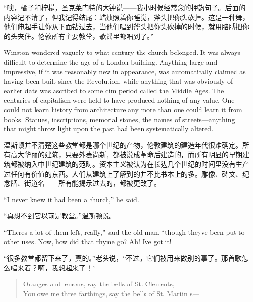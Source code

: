 \begin{paracol}{2}
\switchcolumn

``噢，橘子和柠檬，圣克莱门特的大钟说——我小时候经常念的押韵句子。后面的内容记不清了，但我记得结尾：蜡烛照着你睡觉，斧头把你头砍掉。这是一种舞，他们伸起手让你从下面钻过去，当他们唱到斧头把你头砍掉的时候，就用胳膊把你的头夹住。伦敦所有主要教堂，歌谣里都唱到了。''

\switchcolumn*

Winston wondered vaguely to what century the church belonged. It was
always difficult to determine the age of a London building. Anything
large and impressive, if it was reasonably new in appearance, was
automatically claimed as having been built since the Revolution, while
anything that was obviously of earlier date was ascribed to some dim
period called the Middle Ages. The centuries of capitalism were held to
have produced nothing of any value. One could not learn history from
architecture any more than one could learn it from books. Statues,
inscriptions, memorial stones, the names of streets---anything that
might throw light upon the past had been systematically altered.

\switchcolumn

温斯顿并不清楚这些教堂都是哪个世纪的产物，伦敦建筑的建造年代很难确定。所有高大华丽的建筑，只要外表尚新，都被说成革命后建造的，而所有明显的早期建筑都被纳入中世纪建筑的范畴。资本主义被认为在长达几个世纪的时间里没有生产过任何有价值的东西。人们从建筑上了解到的并不比书本上的多。雕像、碑文、纪念牌、街道名——所有能揭示过去的，都被更改了。

\switchcolumn*

``I never knew it had been a church,'' he said.

\switchcolumn

``真想不到它以前是教堂。''温斯顿说。

\switchcolumn*

``There\textquotesingle s a lot of them left, really,'' said the old man,
``though they\textquotesingle ve been put to other uses. Now, how did
that rhyme go? Ah! I\textquotesingle ve got it!

\switchcolumn

``很多教堂都留下来了，真的。''老头说，``不过，它们被用来做别的事了。那首歌怎么唱来着？啊，我想起来了！''

\switchcolumn*

\begin{quotation}
  Oranges and lemons, say the bells of St.
  Clement\textquotesingle s,\\
  You owe me three farthings, say the bells of St. Martin\textquotesingle
  s---
\end{quotation}


\end{paracol}
